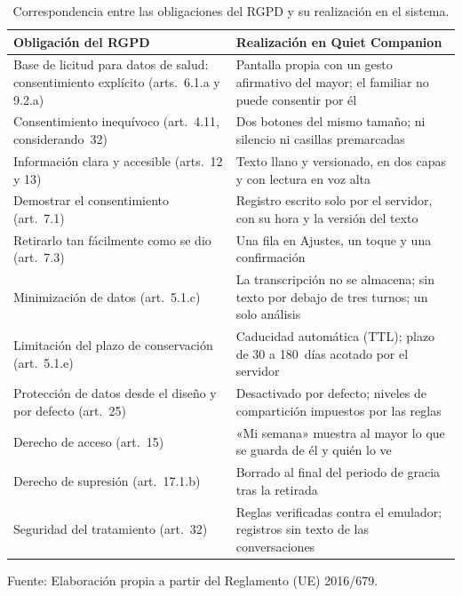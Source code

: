 \begin{table}[htbp]
    \centering
    \small
    \begin{tabularx}{\textwidth}{@{}>{\RaggedRight\arraybackslash}p{} >{\RaggedRight\arraybackslash}X@{}}
        \toprule
        \textbf{Obligación del RGPD} & \textbf{Realización en Quiet Companion} \\
        \midrule
        Base de licitud para datos de salud: consentimiento explícito (arts.~6.1.a y 9.2.a)
            & Pantalla propia con un gesto afirmativo del mayor; el familiar no puede consentir por él \\
        Consentimiento inequívoco (art.~4.11, considerando~32)
            & Dos botones del mismo tamaño; ni silencio ni casillas premarcadas \\
        Información clara y accesible (arts.~12 y 13)
            & Texto llano y versionado, en dos capas y con lectura en voz alta \\
        Demostrar el consentimiento (art.~7.1)
            & Registro escrito solo por el servidor, con su hora y la versión del texto \\
        Retirarlo tan fácilmente como se dio (art.~7.3)
            & Una fila en Ajustes, un toque y una confirmación \\
        Minimización de datos (art.~5.1.c)
            & La transcripción no se almacena; sin texto por debajo de tres turnos; un solo análisis \\
        Limitación del plazo de conservación (art.~5.1.e)
            & Caducidad automática (TTL); plazo de 30 a 180~días acotado por el servidor \\
        Protección de datos desde el diseño y por defecto (art.~25)
            & Desactivado por defecto; niveles de compartición impuestos por las reglas \\
        Derecho de acceso (art.~15)
            & «Mi semana» muestra al mayor lo que se guarda de él y quién lo ve \\
        Derecho de supresión (art.~17.1.b)
            & Borrado al final del periodo de gracia tras la retirada \\
        Seguridad del tratamiento (art.~32)
            & Reglas verificadas contra el emulador; registros sin texto de las conversaciones \\
        \bottomrule
    \end{tabularx}
    \caption{Correspondencia entre las obligaciones del RGPD y su realización en el sistema.}
    \label{tab:rgpd}

    \vspace{2pt}
    {\footnotesize Fuente: Elaboración propia a partir del Reglamento (UE) 2016/679.}
\end{table}

